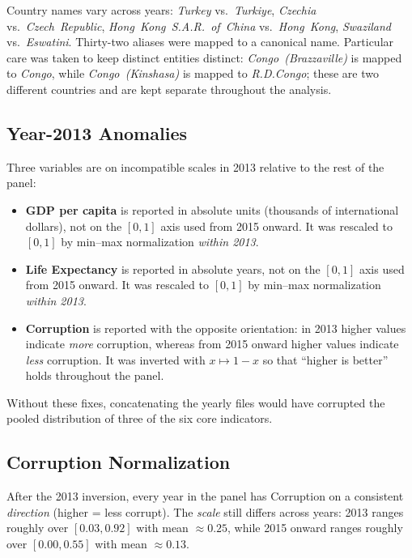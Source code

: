 Country names vary across years: \emph{Turkey} vs.\ \emph{Turkiye}, \emph{Czechia} vs.\ \emph{Czech\ Republic}, \emph{Hong\ Kong\ S.A.R.\ of\ China} vs.\ \emph{Hong\ Kong}, \emph{Swaziland} vs.\ \emph{Eswatini}. Thirty-two aliases were mapped to a canonical name. Particular care was taken to keep distinct entities distinct: \emph{Congo\ (Brazzaville)} is mapped to \emph{Congo}, while \emph{Congo\ (Kinshasa)} is mapped to \emph{R.D.Congo}; these are two different countries and are kept separate throughout the analysis.

\subsection{Year-2013 Anomalies}
\label{sec:data-cleaning-2013}

Three variables are on incompatible scales in 2013 relative to the rest of the panel:
\begin{itemize}
	\item \textbf{GDP per capita} is reported in absolute units (thousands of international dollars), not on the $[0,1]$ axis used from 2015 onward. It was rescaled to $[0,1]$ by min--max normalization \emph{within 2013}.
	\item \textbf{Life Expectancy} is reported in absolute years, not on the $[0,1]$ axis used from 2015 onward. It was rescaled to $[0,1]$ by min--max normalization \emph{within 2013}.
	\item \textbf{Corruption} is reported with the opposite orientation: in 2013 higher values indicate \emph{more} corruption, whereas from 2015 onward higher values indicate \emph{less} corruption. It was inverted with $x \mapsto 1 - x$ so that ``higher is better'' holds throughout the panel.
\end{itemize}
Without these fixes, concatenating the yearly files would have corrupted the pooled distribution of three of the six core indicators.

\subsection{Corruption Normalization}
\label{sec:data-cleaning-corruption}

After the 2013 inversion, every year in the panel has Corruption on a consistent \emph{direction} (higher = less corrupt). The \emph{scale} still differs across years: 2013 ranges roughly over $[0.03, 0.92]$ with mean $\approx 0.25$, while 2015 onward ranges roughly over $[0.00, 0.55]$ with mean $\approx 0.13$.

